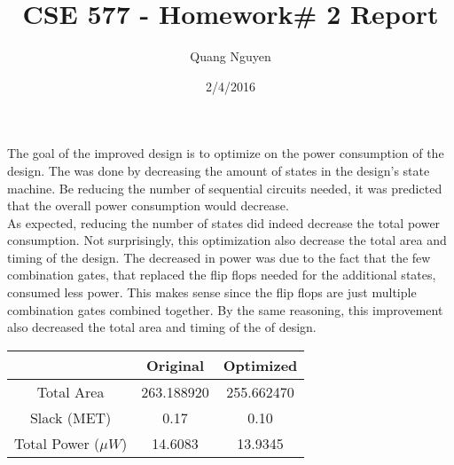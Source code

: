 \documentclass[11pt]{article}
\title{CSE 577 - Homework\# 2 Report}
\author{Quang Nguyen}
\date{2/4/2016}
\begin{document}
\maketitle

The goal of the improved design is to optimize on the power consumption of the design. The was done by decreasing the amount of states in the design's state machine. Be reducing the number of sequential circuits needed, it was predicted that the overall power consumption would decrease. \\

As expected, reducing the number of states did indeed decrease the total power consumption. Not surprisingly, this optimization also decrease the total area and timing of the design. The decreased in power was due to the fact that the few combination gates, that replaced the flip flops needed for the additional states, consumed less power. This makes sense since the flip flops are just multiple combination gates combined together. By the same reasoning, this improvement also decreased the total area and timing of the of design.\\

\begin{center}
\begin{tabular}{|c|c|c|}
	\hline		& Original 		& Optimized 	\\ \hline
	Total Area  & 263.188920 	& 255.662470 	\\ \hline
	Slack (MET) & 0.17          & 0.10			\\ \hline 
	Total Power ($\mu W$) 
				& 14.6083 		& 13.9345		\\ \hline
\end{tabular}
\end{center}
\end{document}
